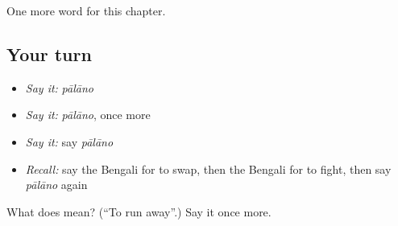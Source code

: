 \begin{grammarlens}[title={What you've built}]
One more word for this chapter.
\end{grammarlens}

\subsection*{Your turn}
\begin{itemize}
\raggedright
  \item \emph{Say it:} \emph{pālāno}
  \item \emph{Say it:} \emph{pālāno}, once more
  \item \emph{Say it:} say \emph{pālāno}
  \item \emph{Recall:} say the Bengali for to swap, then the Bengali for to fight, then say \emph{pālāno} again
\end{itemize}

\begin{tcolorbox}[breakable,colback=teal!4,colframe=teal!35!black,title={Before you move on}]
What does  mean? (\textquotedblleft{}To run away\textquotedblright{}.) Say it once more.
\end{tcolorbox}
